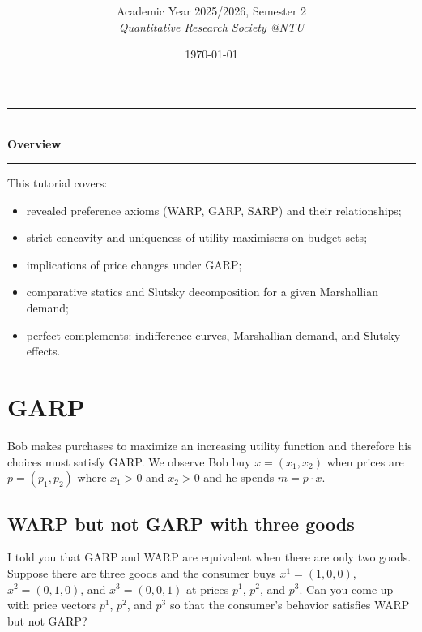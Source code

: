 \documentclass[12pt]{article}
\title{
\CourseCode \CourseName \\[0.3em]
\large \DocType
}
\author{
  Academic Year 2025/2026, Semester 2 \\[0.25em]
  \textit{Quantitative Research Society @NTU}
}
\date{\today}
\newcommand{\dotp}{\cdot}
\begin{document}
\maketitle
\thispagestyle{plainfirst}
\pagestyle{main}
\bigskip

\begin{center}
  \rule{0.8\textwidth}{0.4pt}\\[4pt]
  \textbf{Overview}\\[2pt]
  \rule{0.8\textwidth}{0.4pt}
\end{center}

\noindent
This tutorial covers:
\begin{itemize}[leftmargin=*]
  \item revealed preference axioms (WARP, GARP, SARP) and their relationships;
  \item strict concavity and uniqueness of utility maximisers on budget sets;
  \item implications of price changes under GARP;
  \item comparative statics and Slutsky decomposition for a given Marshallian demand;
  \item perfect complements: indifference curves, Marshallian demand, and Slutsky effects.
\end{itemize}

\bigskip

\newpage
\section{GARP}

Bob makes purchases to maximize an increasing utility function and therefore his choices
must satisfy GARP. We observe Bob buy \(x=(x_1,x_2)\) when prices are \(p=(p_1,p_2)\) where
\(x_1>0\) and \(x_2>0\) and he spends \(m=p\dotp x\).

\subsection{WARP but not GARP with three goods}
I told you that GARP and WARP are equivalent when there are only two goods.
Suppose there are three goods and the consumer buys \(x^{1}=(1,0,0)\), \(x^{2}=(0,1,0)\), and
\(x^{3}=(0,0,1)\) at prices \(p^{1}\), \(p^{2}\), and \(p^{3}\).
Can you come up with price vectors \(p^{1}\), \(p^{2}\), and \(p^{3}\) so that the consumer’s behavior satisfies WARP but not GARP?
\end{document}
